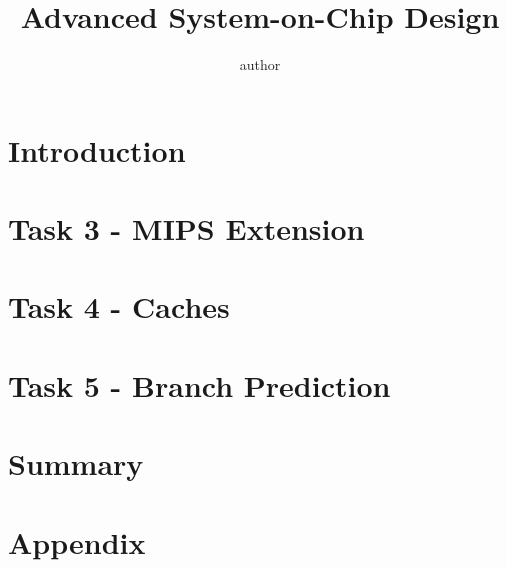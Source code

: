 \documentclass[11pt,a4paper]{article}
\title{Advanced System-on-Chip Design}
\author{author}
\begin{document}


\tableofcontents
\newpage
\listoffigures
\newpage
\listoftables
\newpage
\lstlistoflistings

\newpage
\section{Introduction}


\newpage
\section{Task 3 - MIPS Extension}


\newpage
\section{Task 4 - Caches}


\newpage
\section{Task 5 - Branch Prediction}


\newpage
\section{Summary}


\newpage
\pagestyle{scrheadings}
\section{Appendix}



\newpage
\nocite{*}
\printbibliography

\end{document}
